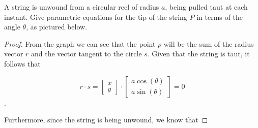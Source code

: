 \begin{exercise} \label{e2.1.3}
    A string is unwound from a circular reel of radius \( a \), being pulled taut at each instant. Give parametric equations for the tip of the string \( P \) in terms of the angle \( \theta \), as pictured below.
    
    \begin{center}
    \end{center}
    
    \begin{proof}
        From the graph we can see that the point \( p \) will be the sum of the radius vector \( r \) and the vector tangent to the circle \( s \). Given that the string is taut, it follows that 
        
        \[ r \cdot s = \begin{bmatrix} x \\ y \end{bmatrix} \cdot \begin{bmatrix} a \cos(\theta) \\ a\sin(\theta) \end{bmatrix} = 0 \]. 
        
        Furthermore, since the string is being unwound, we know that 
        

\end{proof}
\end{exercise}
